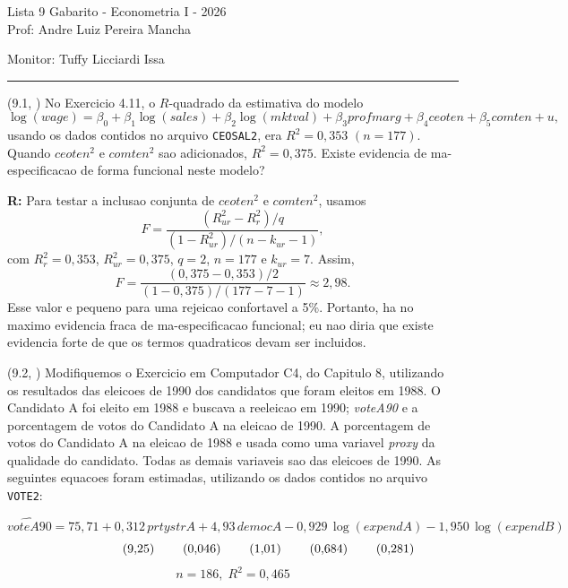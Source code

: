\documentclass[12pt,letterpaper, onecolumn]{exam}
\renewenvironment{solution}
{\par\noindent\textbf{R:}\enspace\color{blue}}
{\par\color{black}}
\begin{document}
\begingroup
\centering
\LARGE Lista 9 Gabarito - Econometria I - 2026\\[0.5em]
\large Prof: Andre Luiz Pereira Mancha \par
\large Monitor: Tuffy Licciardi Issa \par
\endgroup
\rule{\textwidth}{0.4pt}
\pointsdroppedatright
\printanswers
\renewcommand{\solutiontitle}{\noindent\textbf{Ans:}\enspace}
\newcommand{\qstar}{\hspace{-0.6em}\textsuperscript{*}\hspace{0.2em}}

\begin{questions}

\question (9.1, \citep{wooldridge2016}) No Exercicio 4.11, o \(R\)-quadrado da estimativa do modelo
\[
\log(wage)=\beta_0+\beta_1\log(sales)+\beta_2\log(mktval)+\beta_3 profmarg+\beta_4 ceoten+\beta_5 comten+u,
\]
usando os dados contidos no arquivo \texttt{CEOSAL2}, era \(R^2=0{,}353\) \((n=177)\). Quando \(ceoten^2\) e \(comten^2\) sao adicionados, \(R^2=0{,}375\). Existe evidencia de ma-especificacao de forma funcional neste modelo?

\begin{solution}
Para testar a inclusao conjunta de \(ceoten^2\) e \(comten^2\), usamos
\[
F
=
\frac{(R^2_{ur}-R^2_r)/q}{(1-R^2_{ur})/(n-k_{ur}-1)},
\]
com \(R^2_r=0{,}353\), \(R^2_{ur}=0{,}375\), \(q=2\), \(n=177\) e \(k_{ur}=7\). Assim,
\[
F
=
\frac{(0{,}375-0{,}353)/2}{(1-0{,}375)/(177-7-1)}
\approx
2{,}98.
\]
Esse valor e pequeno para uma rejeicao confortavel a 5\%. Portanto, ha no maximo evidencia fraca de ma-especificacao funcional; eu nao diria que existe evidencia forte de que os termos quadraticos devam ser incluidos.
\end{solution}

\vspace{0.7cm}

\question (9.2, \citep{wooldridge2016}) Modifiquemos o Exercicio em Computador C4, do Capitulo 8, utilizando os resultados das eleicoes de 1990 dos candidatos que foram eleitos em 1988. O Candidato A foi eleito em 1988 e buscava a reeleicao em 1990; \textit{voteA90} e a porcentagem de votos do Candidato A na eleicao de 1990. A porcentagem de votos do Candidato A na eleicao de 1988 e usada como uma variavel \textit{proxy} da qualidade do candidato. Todas as demais variaveis sao das eleicoes de 1990. As seguintes equacoes foram estimadas, utilizando os dados contidos no arquivo \texttt{VOTE2}:

\[
\widehat{voteA90}=75{,}71+0{,}312\,prtystrA+4{,}93\,democA-0{,}929\,\log(expendA)-1{,}950\,\log(expendB)
\]
\[
\hspace{2.0cm}(9{,}25)\hspace{0.8cm}(0{,}046)\hspace{0.8cm}(1{,}01)\hspace{0.8cm}(0{,}684)\hspace{0.8cm}(0{,}281)
\]
\[
n=186,\; R^2=0{,}465
\]


\end{questions}
\end{document}

